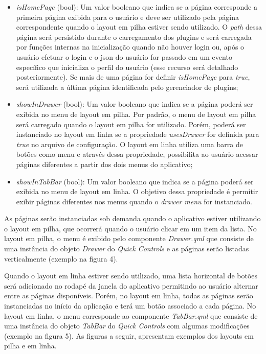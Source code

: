 \begin{itemize}
	\item \textit{isHomePage} (bool): Um valor booleano que indica se a página corresponde a primeira página exibida para o usuário e deve ser utilizado pela página correspondente quando o layout em pilha estiver sendo utilizado. O \textit{path} dessa página será persistido durante o carregamento dos plugins e será carregada por funções internas na inicialização quando não houver login ou, após o usuário efetuar o login e o json do usuário for passado em um evento específico que inicializa o perfil do usuário (esse recurso será detalhado posteriormente). Se mais de uma página for definir \textit{isHomePage} para \textit{true}, será utilizada a última página identificada pelo gerenciador de plugins;

	\item \textit{showInDrawer} (bool): Um valor booleano que indica se a página poderá ser exibida no menu de layout em pilha. Por padrão, o menu de layout em pilha será carregado quando o layout em pilha for utilizado. Porém, poderá ser instanciado no layout em linha se a propriedade \textit{usesDrawer} for definida para \textit{true} no arquivo de configuração. O layout em linha utiliza uma barra de botões como menu e através dessa propriedade, possibilita ao usuário acessar páginas diferentes a partir dos dois menus do aplicativo;

	\item \textit{showInTabBar} (bool): Um valor booleano que indica se a página poderá ser exibida no menu de layout em linha. O objetivo dessa propriedade é permitir exibir páginas diferentes nos menus quando o \textit{drawer menu} for instanciado.
\end{itemize}

As páginas serão instanciadas sob demanda quando o aplicativo estiver utilizando o layout em pilha, que ocorrerá quando o usuário clicar em um item da lista. No layout em pilha, o menu é exibido pelo componente \textit{Drawer.qml} que consiste de uma instância do objeto \textit{Drawer} do \textit{Quick Controls} e as páginas serão listadas verticalmente (exemplo na figura 4).\par

Quando o layout em linha estiver sendo utilizado, uma lista horizontal de botões será adicionado no rodapé da janela do aplicativo permitindo ao usuário alternar entre as páginas disponíveis. Porém, no layout em linha, todas as páginas serão instanciadas no início da aplicação e terá um botão associado a cada página. No layout em linha, o menu corresponde ao componente \textit{TabBar.qml} que consiste de uma instância do objeto \textit{TabBar} do \textit{Quick Controls} com algumas modificações (exemplo na figura 5). As figuras a seguir, apresentam exemplos dos layouts em pilha e em linha.

